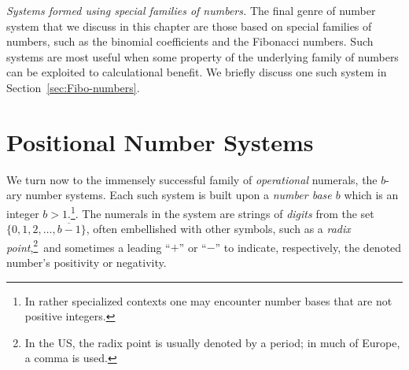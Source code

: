 \medskip


\noindent
{\it Systems formed using special families of numbers.}
The final genre of number system that we discuss in this chapter are those based on special families of numbers, such as the binomial coefficients and the Fibonacci numbers.  Such systems are most useful when some property of the underlying family of numbers can be exploited to calculational benefit.  We briefly discuss one such system in Section~\ref{sec:Fibo-numbers}.


\section{Positional Number Systems}
\label{sec:positional-numbers}

We turn now to the immensely successful family of {\em operational} numerals, the $b$-ary number systems.  Each such system is built upon a {\em number base $b$} which is an integer $b> 1$.\footnote{In rather specialized contexts one may encounter number bases that are not positive integers.}. The numerals in the system are strings of {\it digits} from the set
$\{0, 1, 2, \ldots, \overline{b-1}\}$, often embellished with other symbols, such as a {\em radix point},\footnote{In the US, the radix point is usually denoted by a period; in much of Europe, a comma is used.}~and sometimes a leading ``$+$'' or ``$-$'' to indicate, respectively, the denoted number's positivity or negativity.

\medskip


\noindent {}

\medskip

